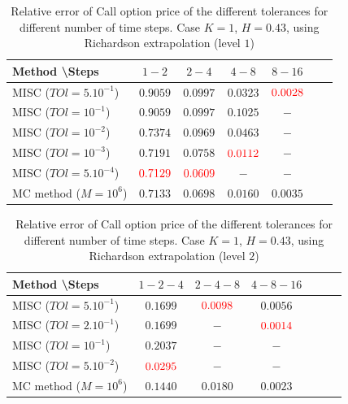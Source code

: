 \documentclass[11pt]{article}
\begin{document}
\begin{table}[h!]
	\centering
	\begin{tabular}{l*{5}{c}r}
		Method \textbackslash  Steps    &$1-2$        & $2-4$ & $4-8$ & $8-16$  \\
		\hline
		MISC ($TOl=5.10^{-1}$)  &$0.9059$ & $0.0997$ & $0.0323$ & ${\color{red}0.0028}$  \\
		MISC ($TOl=10^{-1}$)  &$0.9059$ &$0.0997$ & $0.1025$ & $-$ \\
		MISC ($TOl=10^{-2}$)  & $0.7374$ &$0.0969$ & $0.0463$ & $-$ \\		
		MISC ($TOl=10^{-3}$)  & $0.7191$ & $0.0758$ & ${\color{red}0.0112}$ & $-$ \\	
		MISC ($TOl=5.10^{-4}$)  &${\color{red}0.7129}$ & ${\color{red}0.0609}$ & $-$ & $-$ \\
		MC method ($M=10^{6}$)&$ \mathbf{0.7133}$    & $\mathbf{0.0698}$  & $\mathbf{0.0160}$  & $\mathbf{0.0035}$ \\
		\hline
	\end{tabular}
	\caption{Relative error of Call option price of the different tolerances for different number of time steps. Case $K=1$, $H=0.43$, using Richardson extrapolation (level $1$)}
	\label{Relative error of Call option price of the different tolerances for different number of time steps. Case $K=1, H=0.43$ , using Richardson extrapolation}
\end{table}



\begin{table}[h!]
	\centering
	\begin{tabular}{l*{5}{c}r}
		Method \textbackslash  Steps    &$1-2-4$        & $2-4-8$ & $4-8-16$   \\
		\hline
		MISC ($TOl=5.10^{-1}$)  &$ 0.1699$ & ${\color{red}0.0098}$ & $ 0.0056$   \\
		MISC ($TOl=2.10^{-1}$)  &$ 0.1699$ &$-$ & ${\color{red} 0.0014}$  \\
		MISC ($TOl=10^{-1}$)  &$0.2037$ &$-$ & $-$  \\
		MISC ($TOl=5.10^{-2}$)  &${\color{red}0.0295}$ & $-$ & $-$  \\
		MC method ($M=10^{6}$)&$\mathbf{0.1440}$    & $ \mathbf{0.0180}  $  & $\mathbf{0.0023}$   \\
		\hline
	\end{tabular}
	\caption{Relative error of Call option price of the different tolerances for different number of time steps. Case $K=1$, $H=0.43$, using Richardson extrapolation (level $2$)}
	\label{Relative error of Call option price of the different tolerances for different number of time steps. Case $K=1, H=0.43$ , using Richardson extrapolation_level2}
\end{table}
\newpage
\end{document}
